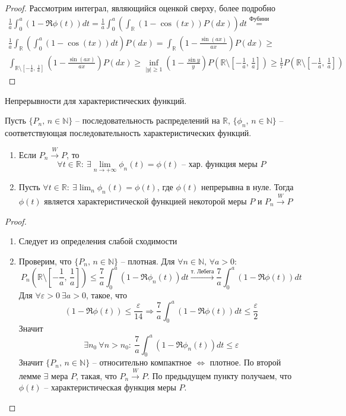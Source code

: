 \begin{proof}
	Рассмотрим интеграл, являющийся оценкой сверху, более подробно
	\begin{align*}
		\frac{1}{a}\int_0^a (1 - \Re\phi(t))dt = \frac{1}{a}\int_0^a \left(\int_\mathbb{R} (1 - \cos(tx))P(dx)\right)dt \stackrel{\text{Фубини}}{=} \\
		\frac{1}{a}\int_\mathbb{R}\left(\int_0^a (1 - \cos(tx))dt\right)P(dx) = \int_\mathbb{R}\left(1 - \frac{\sin(ax)}{ax}\right)P(dx) \geq       \\
		\int_{\mathbb{R} \setminus [-\frac{1}{a},\,\frac{1}{a}]}\left(1 - \frac{\sin(ax)}{ax}\right)P(dx) \geq \inf_{|y| \geq 1}\left(1 - \frac{\sin y}{y}\right)P\left(\mathbb{R} \setminus \left[-\frac{1}{a},\,\frac{1}{a}\right]\right) \geq \frac{1}{7}P\left(\mathbb{R} \setminus\left[-\frac{1}{a},\,\frac{1}{a}\right]\right)
	\end{align*}
\end{proof}

\begin{theorem}
	Непрерывности для характеристических функций.

	Пусть $\{P_n,\, n \in \mathbb{N}\}$ -- последовательность распределений на $\mathbb{R}$, $\{\phi_n,\, n \in \mathbb{N}\}$ -- соответствующая последовательность характеристических функций.
	\begin{enumerate}
		\item Если $P_n \stackrel{W}{\to} P$, то
		      \[\forall t \in \mathbb{R} :\: \exists\lim_{n \to +\infty} \phi_n(t) = \phi(t) \text{ -- хар. функция меры }P\]
		\item Пусть $\forall t \in \mathbb{R} :\: \exists \lim_n \phi_n(t) = \phi(t)$, где $\phi(t)$ непрерывна в нуле. Тогда $\phi(t)$ является характеристической функцией некоторой меры $P$ и $P_n \stackrel{W}{\to} P$
	\end{enumerate}
\end{theorem}

\begin{proof}
	\begin{enumerate}
		\item Следует из определения слабой сходимости
		\item Проверим, что $\{P_n,\, n \in \mathbb{N}\}$ -- плотная.
		      Для $\forall n \in \mathbb{N},\, \forall a > 0$:
		      \[P_n\left(\mathbb{R}\setminus\left[-\frac{1}{a},\,\frac{1}{a}\right]\right) \leq \frac{7}{a}\int_0^a (1 - \Re\phi_n(t))dt \stackrel{\text{т. Лебега}}{\to} \frac{7}{a}\int_0^a(1 - \Re\phi(t))dt\]
		      Для $\forall \varepsilon > 0 \: \exists a > 0$, такое, что
		      \[(1 - \Re\phi(t)) \leq \frac{\varepsilon}{14} \Rightarrow \frac{7}{a}\int_0^a (1 - \Re\phi(t))dt \leq \frac{\varepsilon}{2}\]
		      Значит
		      \[\exists n_0 \: \forall n > n_0 :\: \frac{7}{a}\int_0^a (1 - \Re\phi_n(t))dt \leq \varepsilon \]
		      Значит $\{P_n,\, n \in \mathbb{N}\}$ -- относительно компактное $\Leftrightarrow$ плотное. По второй лемме $\exists$ мера $P$, такая, что $P_n \stackrel{W}{\to} P$. По предыдущем пункту получаем, что $\phi(t)$ -- характеристическая функция меры $P$.
	\end{enumerate}
\end{proof}
